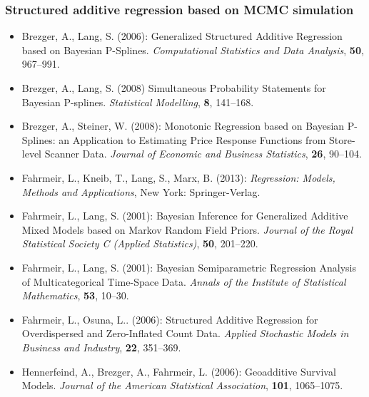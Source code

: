 \documentclass[11pt,a4paper,twoside]{bayesxarticle}
\begin{document}
\subsubsection*{Structured additive regression based on MCMC
simulation}

\begin{itemize}
\item Brezger, A., Lang, S. (2006): Generalized Structured Additive Regression based on Bayesian P-Splines. {\it
    Computational Statistics and Data Analysis}, {\bf 50}, 967--991.
    \vspace{-0.25cm}
\item Brezger, A., Lang, S. (2008)
      Simultaneous Probability Statements for Bayesian P-splines.
      {\it Statistical Modelling}, {\bf 8},
      141--168.\vspace{-0.25cm}
\item Brezger, A., Steiner, W. (2008): Monotonic Regression based on Bayesian P-Splines: an Application to Estimating Price Response Functions from Store-level Scanner Data. {\it Journal of Economic and Business Statistics}, {\bf 26}, 90--104. \vspace{-0.25cm}
\item Fahrmeir, L.,  Kneib, T., Lang, S., Marx, B. (2013):
{\it Regression: Models, Methods and Applications},
 New York: Springer-Verlag.\vspace{-0.25cm}
 \item Fahrmeir, L., Lang, S. (2001): Bayesian Inference for Generalized Additive Mixed Models based on Markov Random Field
    Priors. {\it Journal of the Royal Statistical Society C (Applied Statistics)}, {\bf 50}, 201--220.\vspace{-0.25cm}
\item Fahrmeir, L., Lang, S. (2001): Bayesian Semiparametric Regression Analysis of Multicategorical Time-Space Data. {\it
    Annals of the Institute of Statistical Mathematics}, {\bf 53}, 10--30.\vspace{-0.25cm}
\item Fahrmeir, L., Osuna, L.. (2006): Structured Additive Regression for Overdispersed and Zero-Inflated Count Data. {\it
    Applied Stochastic Models in Business and Industry}, {\bf 22}, 351--369.\vspace{-0.25cm}
\item Hennerfeind, A., Brezger, A., Fahrmeir, L. (2006): Geoadditive Survival Models. {\it Journal of the American
    Statistical Association}, {\bf 101}, 1065--1075.\vspace{-0.25cm}

\end{itemize}
\end{document}
